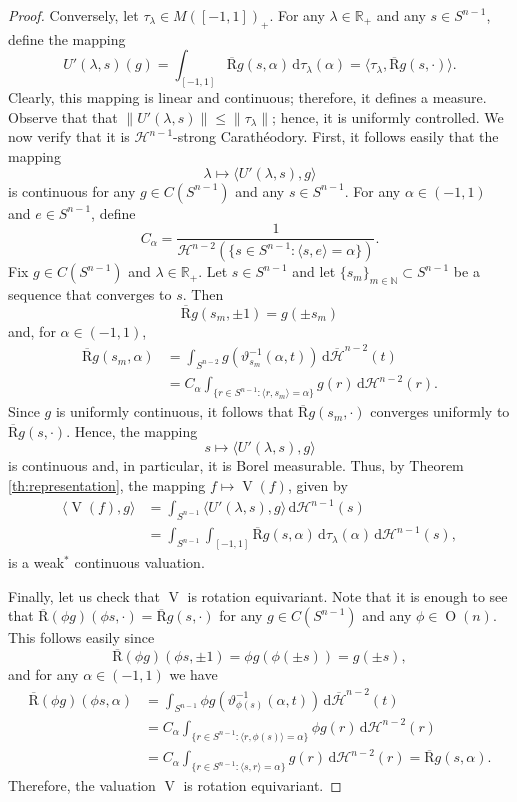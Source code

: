 \documentclass[10pt,a4paper]{amsart}
\renewcommand{\d}{\,\mathrm{d}}
\newcommand{\hm}{\mathcal H^{n-2}}
\newcommand{\hn}{\mathcal H^{n-1}}
\newcommand{\oV}{\operatorname{V}}
\newcommand{\on}{\operatorname{O}(n)}
\newcommand{\radon}{\operatorname{\overline R}}
\newcommand{\rhot}{\tau}
\newcommand{\rp}{\mathbb R_{\scriptscriptstyle +}}
\newcommand{\sm}{S^{n-2}}
\newcommand{\sn}{{S^{n-1}}}
\begin{document}
\begin{proof}
\goodbreak
Conversely, let $\rhot_\lambda\in M([-1,1])_{\scriptscriptstyle +}$. For any $\lambda\in\rp$ and any $s\in\sn$, define the mapping
\[
     U'(\lambda,s)(g) =\int_{[-1,1]} \radon g (s, \alpha)\d \rhot_\lambda (\alpha)=\langle \rhot_\lambda, \radon g (s, \cdot)\rangle.
\]
Clearly, this mapping is linear and continuous; therefore, it defines a measure. Observe that that $\|U'(\lambda,s)\|\leq \|\rhot_\lambda\|$; hence, it is uniformly controlled. We now verify that it is $\mathcal{H}^{n-1}$-strong Carath\'eodory. First, it follows easily that the mapping
\[
    \lambda\mapsto \langle U'(\lambda,s),g\rangle
\]
is continuous for any $g\in C(\sn)$ and any $s\in \sn$. For any $\alpha\in(-1,1)$ and $e\in\sn$, define
\[
    C_\alpha=
    \frac{1}{\hm(\{s\in\sn:\langle s,e\rangle=\alpha\})}.
\] 
Fix $g\in C(\sn)$ and $\lambda\in\rp$. Let $s\in \sn$ and let $\{s_m\}_{m\in\mathbb{N}}\subset\sn$ be a sequence that converges to $s$. Then
\[
    \radon g (s_m, \pm 1)=g(\pm s_m)
\]
and, for $\alpha\in(-1,1)$,
\begin{align*}
   \radon g (s_m, \alpha)&=\int_{\sm}g(\vartheta^{-1}_{s_m}(\alpha,t))\d\overline{\mathcal{H}}^{n-2}(t)\\
    &=C_\alpha \int_{\{r\in\sn:\langle r,s_m\rangle=\alpha\}}g(r)\d\hm(r).
\end{align*} 
Since $g$ is uniformly continuous, it follows that $\radon g (s_m, \cdot)$ converges uniformly to $\radon g (s, \cdot)$. Hence, the mapping 
\[
    s\mapsto \langle U'(\lambda,s),g\rangle
\]
is continuous and, in particular, it is Borel measurable. Thus, by Theorem \ref{th:representation}, the mapping $f\mapsto \oV (f)$, given by
\begin{align*}
    \langle \oV(f),g\rangle &=\int_\sn \langle U'(\lambda,s),g\rangle \d \hn(s)\\
    &=\int_{\sn}\int_{[-1,1]} \radon g (s, \alpha)\d\rhot_\lambda(\alpha)\d\hn(s),
\end{align*}
is a weak$^*$ continuous valuation.

Finally, let us check that $\oV$ is rotation equivariant. Note that it is enough to see that $\radon (\phi g) (\phi s, \cdot)= \radon g (s, \cdot)$ for any $g\in C(\sn)$ and any $\phi\in\on$. This follows easily since
\[
   \radon (\phi g) (\phi s, \pm 1) =\phi g(\phi(\pm s))=g(\pm s),
\]
and for any $\alpha\in(-1,1)$ we have
\begin{align*}
   \radon (\phi g) (\phi s, \alpha)&=\int_{\sn}\phi g(\vartheta_{\phi(s)}^{-1}(\alpha,t))\d \overline{\mathcal{H}}^{n-2}(t)\\
    &=C_\alpha \int_{\{r\in\sn: \langle r,\phi(s)\rangle=\alpha\}}\phi g(r)\d \hm(r)\\
    &=C_\alpha \int_{\{r\in\sn:\langle s,r\rangle =\alpha\} }g(r)\d\hm(r)=\radon g (s, \alpha).
\end{align*}
Therefore, the valuation $\oV$ is rotation equivariant.
\end{proof}
\end{document}
